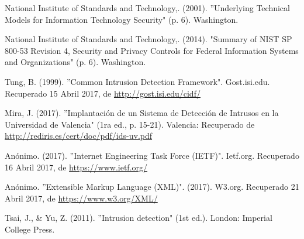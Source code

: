 \begin{thebibliography}{99}
 National Institute of Standards and Technology,. (2001). ''Underlying Technical Models for Information Technology Security" (p. 6). Washington.

 National Institute of Standards and Technology,. (2014). "Summary of NIST SP 800-53 Revision 4, Security and Privacy Controls for Federal Information Systems and Organizations" (p. 6). Washington.

 Tung, B. (1999). ''Common Intrusion Detection Framework". Gost.isi.edu. Recuperado 15 Abril 2017, de \url{http://gost.isi.edu/cidf/}

 Mira, J. (2017). ''Implantación de un Sistema de Detección de Intrusos en la Universidad de Valencia" (1ra ed., p. 15-21). Valencia: Recuperado de \url{http://rediris.es/cert/doc/pdf/ids-uv.pdf}

 Anónimo. (2017). ''Internet Engineering Task Force (IETF)". Ietf.org. Recuperado 16 Abril 2017, de \url{https://www.ietf.org/}

 Anónimo. ''Extensible Markup Language (XML)". (2017). W3.org. Recuperado 21 Abril 2017, de \url{https://www.w3.org/XML/}

 Tsai, J., \& Yu, Z. (2011). ''Intrusion detection" (1st ed.). London: Imperial College Press.



\end{thebibliography}

